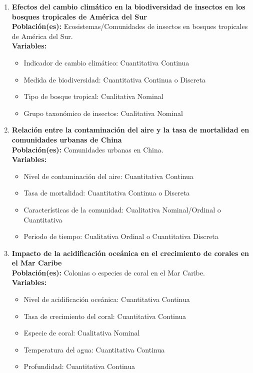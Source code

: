 \documentclass[12pt, letterpaper]{article}
\begin{document}
\begin{enumerate}

\item \textbf{Efectos del cambio climático en la biodiversidad de insectos en los bosques tropicales de América del Sur} \\ 
\textbf{Población(es):} Ecosistemas/Comunidades de insectos en bosques tropicales de América del Sur. \\ 
\textbf{Variables:}
\begin{itemize}
  \item Indicador de cambio climático: Cuantitativa Continua
  \item Medida de biodiversidad: Cuantitativa Continua o Discreta
  \item Tipo de bosque tropical: Cualitativa Nominal
  \item Grupo taxonómico de insectos: Cualitativa Nominal
\end{itemize}

\item \textbf{Relación entre la contaminación del aire y la tasa de mortalidad en comunidades urbanas de China} \\ 
\textbf{Población(es):} Comunidades urbanas en China. \\ 
\textbf{Variables:}
\begin{itemize}
  \item Nivel de contaminación del aire: Cuantitativa Continua
  \item Tasa de mortalidad: Cuantitativa Continua o Discreta
  \item Características de la comunidad: Cualitativa Nominal/Ordinal o Cuantitativa
  \item Periodo de tiempo: Cualitativa Ordinal o Cuantitativa Discreta
\end{itemize}

\item \textbf{Impacto de la acidificación oceánica en el crecimiento de corales en el Mar Caribe} \\ 
\textbf{Población(es):} Colonias o especies de coral en el Mar Caribe. \\ 
\textbf{Variables:}
\begin{itemize}
  \item Nivel de acidificación oceánica: Cuantitativa Continua
  \item Tasa de crecimiento del coral: Cuantitativa Continua
  \item Especie de coral: Cualitativa Nominal
  \item Temperatura del agua: Cuantitativa Continua
  \item Profundidad: Cuantitativa Continua
\end{itemize}


\end{enumerate}
\end{document}
